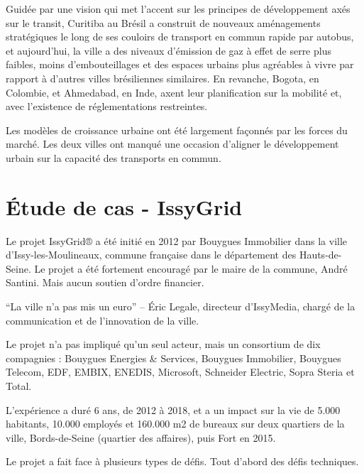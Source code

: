 Guidée par une vision qui met l'accent sur les principes de développement axés sur le transit,
Curitiba au Brésil a construit de nouveaux aménagements stratégiques le long de ses couloirs de transport
en commun rapide par autobus, et aujourd'hui, la ville a des niveaux d'émission de gaz à effet de serre plus
faibles, moins d'embouteillages et des espaces urbains plus agréables à vivre par rapport à d'autres
villes brésiliennes similaires. En revanche, Bogota, en Colombie, et Ahmedabad, en Inde, axent leur
planification sur la mobilité et, avec l'existence de réglementations restreintes.

Les modèles de croissance urbaine ont été largement façonnés par les forces du marché. Les deux villes
ont manqué une occasion d'aligner le développement urbain sur la capacité des transports en commun.

\section{Étude de cas - IssyGrid}
Le projet IssyGrid® a été initié en 2012 par Bouygues Immobilier dans la ville d'Issy-les-Moulineaux,
commune française dans le département des Hauts-de-Seine. Le projet a été fortement encouragé par le
maire de la commune, André Santini. Mais aucun soutien d'ordre financier.

``La ville n’a pas mis un euro'' --  Éric Legale, directeur d’IssyMedia, chargé de la communication et
de l’innovation de la ville.

Le projet n'a pas impliqué qu'un seul acteur, mais un consortium de dix compagnies :
Bouygues Energies \& Services, Bouygues Immobilier, Bouygues Telecom, EDF, EMBIX, ENEDIS,
Microsoft, Schneider Electric, Sopra Steria et Total.

L'expérience a duré 6 ans, de 2012 à 2018, et a un impact sur la vie de 5.000 habitants, 10.000 employés
et 160.000 m2 de bureaux sur deux quartiers de la ville, Bords-de-Seine (quartier des affaires),
puis Fort en 2015.

Le projet a fait face à plusieurs types de défis. Tout d'abord des défis techniques.

